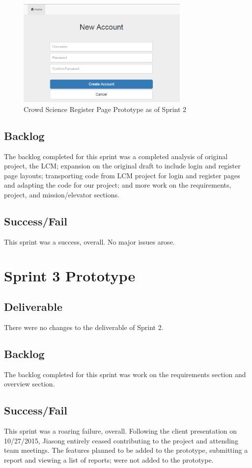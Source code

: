 \begin{figure}[tbh]
\begin{center}
\includegraphics[width=0.75\textwidth]{./figures/prototype_S2_register.png}
\end{center}
\caption{Crowd Science Register Page Prototype as of Sprint 2\label{prototype_S2_register}}
\end{figure}


\subsection{Backlog}
The backlog completed for this sprint was a completed analysis of original project, the LCM; expansion on the original draft to include login and register page layouts; transporting code from LCM project for login and register pages and adapting the code for our project; and more work on the requirements, project, and mission/elevator sections.
\subsection{Success/Fail}
This sprint was a success, overall. No major issues arose.

\section{Sprint 3 Prototype}
\subsection{Deliverable}
There were no changes to the deliverable of Sprint 2.
\subsection{Backlog}
The backlog completed for this sprint was work on the requirements section and overview section. 
\subsection{Success/Fail}
This sprint was a roaring failure, overall. Following the client presentation on 10/27/2015, Jiasong entirely ceased contributing to the project and attending team meetings. The features planned to be added to the prototype, submitting a report and viewing a list of reports; were not added to the prototype.

